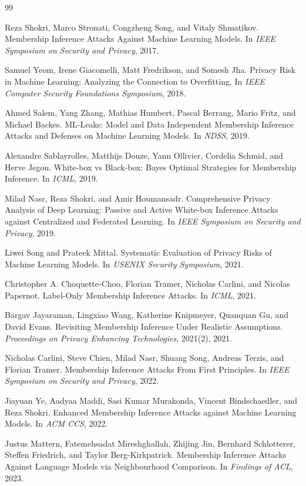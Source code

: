 \documentclass[11pt]{article}
\theoremstyle{definition}
\newcommand{\1}{\mathbf{1}}
\begin{document}
\begin{thebibliography}{99}

Reza Shokri, Marco Stronati, Congzheng Song, and Vitaly Shmatikov.
\newblock Membership Inference Attacks Against Machine Learning Models.
\newblock In \emph{IEEE Symposium on Security and Privacy}, 2017.

Samuel Yeom, Irene Giacomelli, Matt Fredrikson, and Somesh Jha.
\newblock Privacy Risk in Machine Learning: Analyzing the Connection to Overfitting.
\newblock In \emph{IEEE Computer Security Foundations Symposium}, 2018.

Ahmed Salem, Yang Zhang, Mathias Humbert, Pascal Berrang, Mario Fritz, and Michael Backes.
\newblock ML-Leaks: Model and Data Independent Membership Inference Attacks and Defenses on Machine Learning Models.
\newblock In \emph{NDSS}, 2019.

Alexandre Sablayrolles, Matthijs Douze, Yann Ollivier, Cordelia Schmid, and Herve Jegou.
\newblock White-box vs Black-box: Bayes Optimal Strategies for Membership Inference.
\newblock In \emph{ICML}, 2019.

Milad Nasr, Reza Shokri, and Amir Houmansadr.
\newblock Comprehensive Privacy Analysis of Deep Learning: Passive and Active White-box Inference Attacks against Centralized and Federated Learning.
\newblock In \emph{IEEE Symposium on Security and Privacy}, 2019.

Liwei Song and Prateek Mittal.
\newblock Systematic Evaluation of Privacy Risks of Machine Learning Models.
\newblock In \emph{USENIX Security Symposium}, 2021.

Christopher A. Choquette-Choo, Florian Tramer, Nicholas Carlini, and Nicolas Papernot.
\newblock Label-Only Membership Inference Attacks.
\newblock In \emph{ICML}, 2021.

Bargav Jayaraman, Lingxiao Wang, Katherine Knipmeyer, Quanquan Gu, and David Evans.
\newblock Revisiting Membership Inference Under Realistic Assumptions.
\newblock \emph{Proceedings on Privacy Enhancing Technologies}, 2021(2), 2021.

Nicholas Carlini, Steve Chien, Milad Nasr, Shuang Song, Andreas Terzis, and Florian Tramer.
\newblock Membership Inference Attacks From First Principles.
\newblock In \emph{IEEE Symposium on Security and Privacy}, 2022.

Jiayuan Ye, Aadyaa Maddi, Sasi Kumar Murakonda, Vincent Bindschaedler, and Reza Shokri.
\newblock Enhanced Membership Inference Attacks against Machine Learning Models.
\newblock In \emph{ACM CCS}, 2022.

Justus Mattern, Fatemehsadat Mireshghallah, Zhijing Jin, Bernhard Schlotterer, Steffen Friedrich, and Taylor Berg-Kirkpatrick.
\newblock Membership Inference Attacks Against Language Models via Neighbourhood Comparison.
\newblock In \emph{Findings of ACL}, 2023.

\end{thebibliography}
\end{document}
